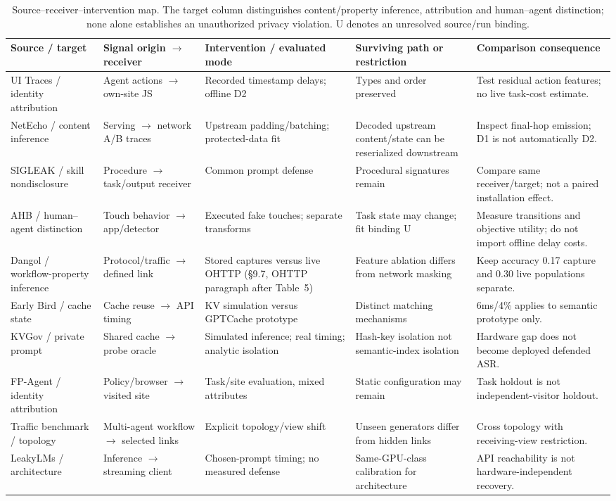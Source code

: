 \begin{table}[t]\centering\footnotesize
\caption{Source--receiver--intervention map. The target column distinguishes content/property inference, attribution and human--agent distinction; none alone establishes an unauthorized privacy violation. U denotes an unresolved source/run binding.}\label{tab:receiver-intervention-matrix}
\begin{tabularx}{\textwidth}{@{}p{}p{}p{}YY@{}}\toprule
Source / target & Signal origin $\to$ receiver & Intervention / evaluated mode & Surviving path or restriction & Comparison consequence\\\midrule
UI Traces / identity attribution & Agent actions $\to$ own-site JS & Recorded timestamp delays; offline D2 & Types and order preserved & Test residual action features; no live task-cost estimate.\\
NetEcho / content inference & Serving $\to$ network A/B traces & Upstream padding/batching; protected-data fit & Decoded upstream content/state can be reserialized downstream & Inspect final-hop emission; D1 is not automatically D2.\\
SIGLEAK / skill nondisclosure & Procedure $\to$ task/output receiver & Common prompt defense & Procedural signatures remain & Compare same receiver/target; not a paired installation effect.\\
AHB / human--agent distinction & Touch behavior $\to$ app/detector & Executed fake touches; separate transforms & Task state may change; fit binding U & Measure transitions and objective utility; do not import offline delay costs.\\
Dangol / workflow-property inference & Protocol/traffic $\to$ defined link & Stored captures versus live OHTTP (\S9.7, OHTTP paragraph after Table~5) & Feature ablation differs from network masking & Keep accuracy 0.17 capture and 0.30 live populations separate.\\
Early Bird / cache state & Cache reuse $\to$ API timing & KV simulation versus GPTCache prototype & Distinct matching mechanisms & 6ms/4\% applies to semantic prototype only.\\
KVGov / private prompt & Shared cache $\to$ probe oracle & Simulated inference; real timing; analytic isolation & Hash-key isolation not semantic-index isolation & Hardware gap does not become deployed defended ASR.\\
FP-Agent / identity attribution & Policy/browser $\to$ visited site & Task/site evaluation, mixed attributes & Static configuration may remain & Task holdout is not independent-visitor holdout.\\
Traffic benchmark / topology & Multi-agent workflow $\to$ selected links & Explicit topology/view shift & Unseen generators differ from hidden links & Cross topology with receiving-view restriction.\\
LeakyLMs / architecture & Inference $\to$ streaming client & Chosen-prompt timing; no measured defense & Same-GPU-class calibration for architecture & API reachability is not hardware-independent recovery.\\\bottomrule
\end{tabularx}\end{table}
